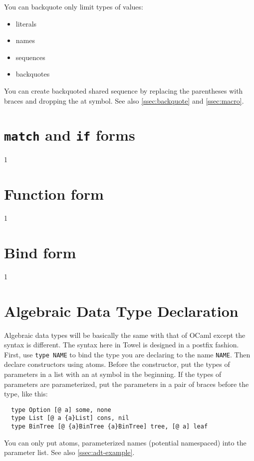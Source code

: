 \documentclass{book}
\begin{document}
You can backquote only limit types of values:
\begin{itemize}
\item literals
\item names
\item sequences
\item backquotes
\end{itemize}

You can create backquoted shared sequence by replacing the parentheses with braces and dropping the at symbol. See also \autoref{ssec:backquote} and \autoref{ssec:macro}.

\section{\texttt{match} and \texttt{if} forms}

1

\section{Function form}

1

\section{Bind form}

1

\section{Algebraic Data Type Declaration}
\label{ssec:atdf}

Algebraic data types will be basically the same with that of OCaml except the syntax is different. The syntax here in Towel is designed in a postfix fashion. First, use \texttt{type NAME} to bind the type you are declaring to the name \texttt{NAME}. Then declare constructors using atoms. Before the constructor, put the types of parameters in a list with an at symbol in the beginning. If the types of parameters are parameterized, put the parameters in a pair of braces before the type, like this:
\begin{verbatim}
  type Option [@ a] some, none
  type List [@ a {a}List] cons, nil
  type BinTree [@ {a}BinTree {a}BinTree] tree, [@ a] leaf
\end{verbatim}

You can only put atoms, parameterized names (potential namespaced) into the parameter list. See also \autoref{ssec:adt-example}.
\end{document}

